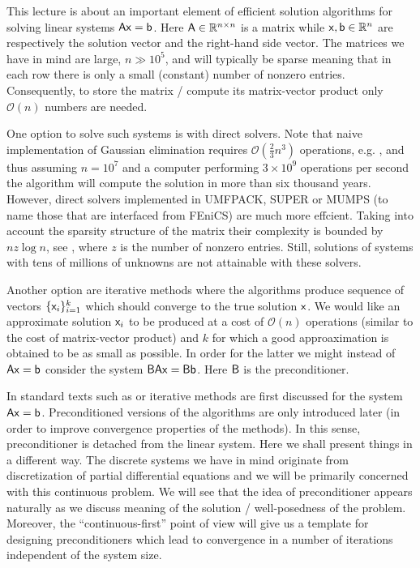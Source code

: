 This lecture is about an important element of efficient solution algorithms for
solving linear systems $\mathsf{A}\mathsf{x}=\mathsf{b}$. Here $\mathsf{A}\in\mathbb{R}^{n\times n}$
is a matrix while $\mathsf{x}, \mathsf{b}\in\mathbb{R}^n$ are respectively the solution vector
and the right-hand side vector. The matrices we have in mind are large, $n \gg
10^5$, and will typically be sparse meaning that in each row there is only a small
(constant) number of nonzero entries. Consequently, to store the matrix / compute its 
matrix-vector product only $\mathcal{O}(n)$ numbers are needed.

One option to solve such systems is with direct solvers. Note that naive
implementation of Gaussian elimination requires $\mathcal{O}(\tfrac{2}{3}n^3)$
operations, e.g. , and thus assuming $n=10^7$ and a computer performing $3\times 10^9$
operations per second the algorithm will compute the solution in more than six
thousand years. However, direct solvers implemented in UMFPACK,
SUPER or MUMPS (to name those that are interfaced from FEniCS)
are much more effcient. Taking into account the sparsity structure of the matrix
their complexity is bounded by $n z \log{n}$, see , where $z$ is the number 
of nonzero entries. Still, solutions of systems with tens of millions of unknowns are not
attainable with these solvers.

Another option are iterative methods where the algorithms produce sequence of
vectors $\{\mathsf{x}_i\}_{i=1}^{k}$ which should converge to the true solution $\mathsf{x}$. We
would like an approximate solution $\mathsf{x}_i$ to be produced at a cost of
$\mathcal{O}(n)$ operations (similar to the cost of matrix-vector product) and $k$
for which a good approaximation is obtained to be as small as possible. In order
for the latter we might instead of $\mathsf{A}\mathsf{x}=\mathsf{b}$ consider the system
$\mathsf{B}\mathsf{A}\mathsf{x}=\mathsf{B}\mathsf{b}$. Here $\mathsf{B}$ is the preconditioner.

In standard texts such as  or  iterative methods are
first discussed for the system $\mathsf{A}\mathsf{x}=\mathsf{b}$. Preconditioned versions of
the algorithms are only introduced later (in order to improve convergence
properties of the methods). In this sense, preconditioner is detached from the
linear system. Here we shall present things in a different way. The discrete systems 
we have in mind originate from discretization of partial differential equations and 
we will be primarily concerned with this continuous problem. We will see that the idea 
of preconditioner appears naturally as we discuss meaning of the solution /
well-posedness of the problem. Moreover, the ``continuous-first'' point of view will 
give us a template for designing preconditioners which lead to convergence in a number 
of iterations independent of the system size.
